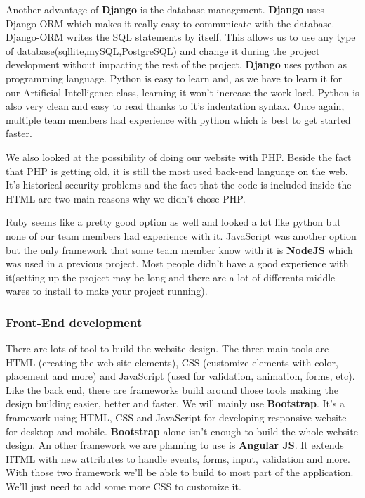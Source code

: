 Another advantage of \textbf{Django} is the database management. \textbf{Django} uses Django-ORM which makes it really easy to communicate with the database. Django-ORM writes the SQL statements by itself. This allows us to use any type of database(sqllite,mySQL,PostgreSQL) and change it during the project development without impacting the rest of the project.
\textbf{Django} uses python as programming language. Python is easy to learn and, as we have to learn it for our Artificial Intelligence class, learning it won't increase the work lord.
Python is also very clean and easy to read thanks to it's indentation syntax. Once again, multiple team members had experience with python which is best to get started faster.\newline

We also looked at the possibility of doing our website with PHP. Beside the fact that PHP is getting old, it is still the most used back-end language on the web. It's historical security problems and the fact that the code is included inside the HTML are two main reasons why we didn't chose PHP.\newline

Ruby seems like a pretty good option as well and looked a lot like python but none of our team members had experience with it. JavaScript was another option but the only framework that some team member know with it is \textbf{NodeJS} which was used in a previous project. Most people didn't have a good experience with it(setting up the project may be long and there are a lot of differents middle wares to install to make your project running).

\subsubsection{Front-End development}

There are lots of tool to build the website design. The three main tools are HTML (creating the web site elements), CSS (customize elements with color, placement and more) and JavaScript (used for validation, animation, forms, etc). Like the back end, there are frameworks build around those tools making the design building easier, better and faster. We will mainly use \textbf{Bootstrap}. It's a framework using HTML, CSS and JavaScript for developing responsive website for desktop and mobile. \textbf{Bootstrap} alone isn't enough to build the whole website design. An other framework we are planning to use is \textbf{Angular JS}. It extends HTML with new attributes to handle events, forms, input, validation and more. With those two framework we'll be able to build to most part of the application. We'll just need to add some more CSS to customize it.

